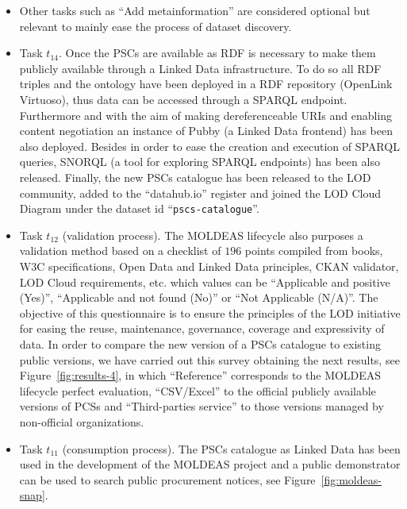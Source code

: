\begin{itemize}
\item Other tasks such as ``Add metainformation'' are considered optional but relevant to mainly ease the process of dataset discovery.

\item Task $t_{14}$. Once the PSCs are available as RDF is necessary to make them publicly available through a Linked Data infrastructure. To 
do so all RDF triples and the ontology have been deployed in a RDF repository (OpenLink Virtuoso), thus data can be accessed through 
a SPARQL endpoint. Furthermore and with the aim of making dereferenceable URIs and enabling content negotiation an instance 
of Pubby (a Linked Data frontend) has been also deployed. Besides in order to ease the creation and execution of SPARQL queries, SNORQL 
(a tool for exploring SPARQL endpoints) has been also released. Finally, the new PSCs catalogue has been released to the 
LOD community, added to the ``datahub.io'' register and joined the LOD Cloud Diagram under the dataset id ``\texttt{pscs-catalogue}''.

\item Task $t_{12}$ (validation process). The MOLDEAS lifecycle also purposes a validation method based on a checklist of $196$ points compiled from books, 
W3C specifications, Open Data and Linked Data principles, CKAN validator, LOD Cloud requirements, etc. which values can be 
``Applicable and positive (Yes)'', ``Applicable and not found (No)'' or ``Not Applicable (N/A)''. The objective of this questionnaire is 
to ensure the principles of the LOD initiative for easing the reuse, maintenance, governance, coverage and expressivity of data. In order to compare 
the new version of a PSCs catalogue to existing public versions, we have carried out this survey obtaining the next results, 
see Figure~\ref{fig:results-4}, in which ``Reference'' corresponds to the MOLDEAS lifecycle perfect evaluation, ``CSV/Excel'' to the official publicly 
available versions of PCSs and ``Third-parties service'' to those versions managed by non-official organizations. 

\item Task $t_{11}$ (consumption process). The PSCs catalogue as Linked Data has been used in the development of the MOLDEAS project and a 
public demonstrator can be used to search public procurement notices, see Figure~\ref{fig:moldeas-snap}.


\end{itemize}



